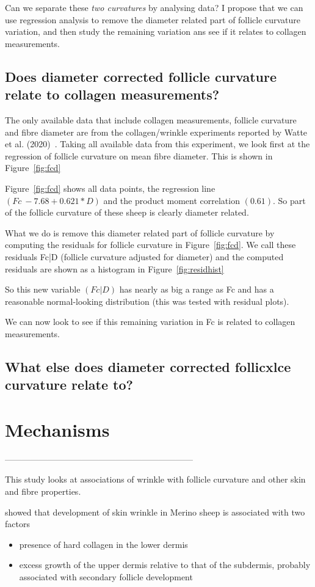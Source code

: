 \documentclass{article}
\begin{document}
Can we separate these {\em two curvatures} by analysing data?  I propose that we can use regression analysis to remove the diameter related part of follicle curvature variation, and then study the remaining variation ans see if it relates to collagen measurements.

\subsection{ Does diameter corrected follicle curvature relate to collagen measurements?}
The only available data that include collagen measurements, follicle curvature and fibre diameter are  from the collagen/wrinkle experiments reported by Watte et al. (2020)~\cite{watts-2020}. Taking all available data from this experiment, we look first at the regression of follicle curvature on mean fibre diameter. This is shown in Figure~\ref{fig:fcd}

Figure~\ref{fig:fcd} shows all data points, the regression line $(Fc ~  -7.68   + 0.621 * D)$ and the product moment correlation $(0.61)$. So part of the follicle curvature of these sheep is clearly diameter related. 

What we do is remove this diameter related part of follicle curvature by computing the residuals for follicle curvature in Figure~\ref{fig:fcd}. We call these residuals Fc|D (follicle curvature adjusted for diameter) and the computed residuals are shown as a histogram in Figure~\ref{fig:residhist}

So this new variable $(Fc | D)$ has nearly as big a range as Fc and has a reasonable normal-looking distribution (this was tested with residual plots).

We can now look to see if this remaining variation in Fc is related to collagen measurements.

\subsection{ What else does diameter corrected follicxlce curvature relate to?}

\section{Mechanisms}

------------------------------------------------------------------

This study looks at associations of wrinkle with follicle curvature and other skin and fibre properties. 

\cite{watts-2020} showed that development of skin wrinkle in Merino sheep is associated with two factors
\begin{itemize}
\item presence of hard collagen in the lower dermis 
\item excess growth of the upper dermis relative to that of the subdermis, probably associated with secondary follicle development
\end{itemize}
\end{document}
